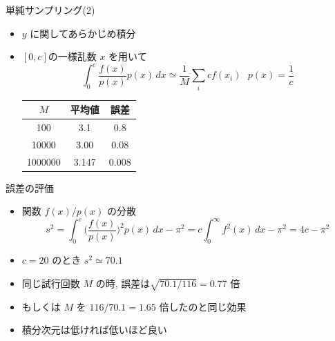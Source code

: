 \begin{frame}[t,fragile]{単純サンプリング(2)}
  \begin{itemize}
    \setlength{\itemsep}{1em}
  \item $y$ に関してあらかじめ積分
  \item $[0,c]$の一様乱数 $x$ を用いて
    \[
    \int_0^c \frac{f(x)}{p(x)} p(x) \, dx \simeq \frac{1}{M} \sum_i c f(x_i) \ \ \ p(x) = \frac{1}{c}
    \]
    \begin{tabular}{|c|c|c|}
      \hline
      $M$ & 平均値 & 誤差 \\
      \hline
      100 & 3.1 & 0.8 \\
      10000 & 3.00 & 0.08 \\
      1000000 & 3.147 & 0.008 \\
      \hline
    \end{tabular}
  \end{itemize}
  \vspace*{-7em}
  \hspace*{17em}
\end{frame}

\begin{frame}[t,fragile]{誤差の評価}
  \begin{itemize}
    \setlength{\itemsep}{1em}
  \item 関数 $f(x)/p(x)$ の分散
    \[
    s^2 = \int_0^c \Big(\frac{f(x)}{p(x)}\Big)^2 p(x) \, dx - \pi^2 = c \int_0^\infty f^2(x) \, dx - \pi^2 = 4c - \pi^2
    \]
  \item $c=20$ のとき $s^2 \simeq 70.1$
  \item 同じ試行回数 $M$ の時, 誤差は$\sqrt{70.1/116} = 0.77$ 倍
  \item もしくは $M$ を $116/70.1 = 1.65$ 倍したのと同じ効果
  \item 積分次元は低ければ低いほど良い
  \end{itemize}
\end{frame}


